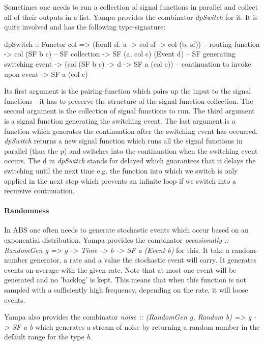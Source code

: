 Sometimes one needs to run a collection of signal functions in parallel and collect all of their outputs in a list. Yampa provides the combinator \textit{dpSwitch} for it. It is quite involved and has the following type-signature:

\begin{HaskellCode}
dpSwitch :: Functor col
         => (forall sf. a -> col sf -> col (b, sf))  -- routing function
         -> col (SF b c)                             -- SF collection
         -> SF (a, col c) (Event d)                  -- SF generating switching event
         -> (col (SF b c) -> d -> SF a (col c))      -- continuation to invoke upon event
         -> SF a (col c)
\end{HaskellCode}

Its first argument is the pairing-function which pairs up the input to the signal functions - it has to preserve the structure of the signal function collection. The second argument is the collection of signal functions to run. The third argument is a signal function generating the switching event. The last argument is a function which generates the continuation after the switching event has occurred. \textit{dpSwitch} returns a new signal function which runs all the signal functions in parallel (thus the p) and switches into the continuation when the switching event occurs. The d in \textit{dpSwitch} stands for delayed which guarantees that it delays the switching until the next time e.g. the function into which we switch is only applied in the next step which prevents an infinite loop if we switch into a recursive continuation.

\paragraph{Randomness}
In ABS one often needs to generate stochastic events which occur based on an exponential distribution. Yampa provides the combinator \textit{occasionally :: RandomGen g => g -> Time -> b -> SF a (Event b)} for this. It take a random-number generator, a rate and a value the stochastic event will carry. It generates events on average with the given rate. Note that at most one event will be generated and no 'backlog' is kept. This means that when this function is not sampled with a sufficiently high frequency, depending on the rate, it will loose events.

Yampa also provides the combinator \textit{noise :: (RandomGen g, Random b) => g -> SF a b} which generates a stream of noise by returning a random number in the default range for the type \textit{b}.

